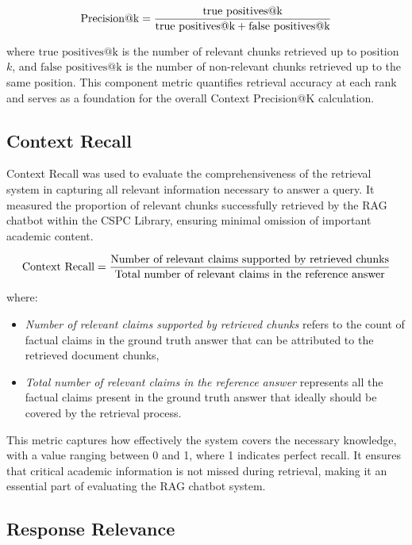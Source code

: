 \begin{refsection}
\begin{equation}
\centering
\text{Precision@k} = 
\frac{
    \text{true positives@k}
}{
    \text{true positives@k} + \text{false positives@k}
}
\end{equation}

where $\text{true positives@k}$ is the number of relevant chunks retrieved up to position $k$, and $\text{false positives@k}$ is the number of non-relevant chunks retrieved up to the same position. This component metric quantifies retrieval accuracy at each rank and serves as a foundation for the overall Context Precision@K calculation.

\subsection*{Context Recall}

Context Recall was used to evaluate the comprehensiveness of the retrieval system in capturing all relevant information necessary to answer a query. It measured the proportion of relevant chunks successfully retrieved by the RAG chatbot within the CSPC Library, ensuring minimal omission of important academic content.

\begin{equation}
\centering
\text{Context Recall} = \frac{\text{Number of relevant claims supported by retrieved chunks}}{\text{Total number of relevant claims in the reference answer}}
\end{equation}

where:

\begin{itemize}
    \item \textit{Number of relevant claims supported by retrieved chunks} refers to the count of factual claims in the ground truth answer that can be attributed to the retrieved document chunks,
    \item \textit{Total number of relevant claims in the reference answer} represents all the factual claims present in the ground truth answer that ideally should be covered by the retrieval process.
\end{itemize}

This metric captures how effectively the system covers the necessary knowledge, with a value ranging between 0 and 1, where 1 indicates perfect recall. It ensures that critical academic information is not missed during retrieval, making it an essential part of evaluating the RAG chatbot system.


\subsection*{Response Relevance}


\end{refsection}
